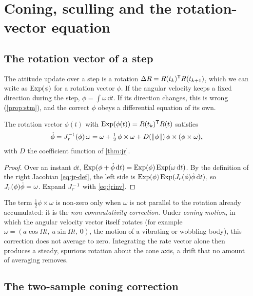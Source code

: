 \section{Coning, sculling and the rotation-vector equation}
\label{sec:coning}

\subsection{The rotation vector of a step}

The attitude update over a step is a rotation $\Delta R = R(t_k)^{\mathsf{T}} R(t_{k+1})$, which we can write as $\operatorname{Exp}(\phi)$ for a rotation vector $\phi$. If the angular
velocity keeps a fixed direction during the step, $\phi = \int\omega\,\dd t$. If its direction changes, this is wrong (\cref{prop:stm}), and the correct $\phi$
obeys a differential equation of its own.

\begin{proposition}
\label{prop:bortz}
The rotation vector $\phi(t)$ with $\operatorname{Exp}(\phi(t)) = R(t_k)^{\mathsf{T}} R(t)$ satisfies
\begin{equation}
  \dot\phi = J_r^{-1}(\phi)\,\omega = \omega + \tfrac12\,\phi\times\omega + D(\|\phi\|)\,\phi\times(\phi\times\omega),
\end{equation}
with $D$ the coefficient function of \cref{thm:jr}.
\end{proposition}
\begin{proof}
Over an instant $\dd t$, $\operatorname{Exp}(\phi + \dot\phi\,\mathrm{d} t) = \operatorname{Exp}(\phi)\operatorname{Exp}(\omega\,\mathrm{d} t)$. By the definition of the right Jacobian \eqref{eq:jr-def}, the left side is
$\operatorname{Exp}(\phi)\operatorname{Exp}(J_r(\phi)\dot\phi\,\mathrm{d} t)$, so $J_r(\phi)\dot\phi = \omega$. Expand $J_r^{-1}$ with \eqref{eq:jrinv}.
\end{proof}

The term $\tfrac12\phi\times\omega$ is non-zero only when $\omega$ is not parallel to the rotation already accumulated: it is the \emph{non-commutativity
correction}. Under \emph{coning motion}, in which the angular velocity vector itself rotates (for example $\omega = (a\cos\Omega t,\ a\sin\Omega t,\ 0)$, the motion of
a vibrating or wobbling body), this correction does not average to zero. Integrating the rate vector alone then produces a steady, spurious
rotation about the cone axis, a drift that no amount of averaging removes.

\subsection{The two-sample coning correction}

